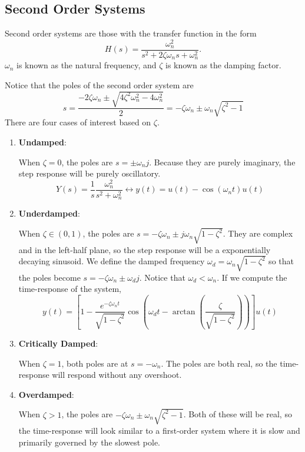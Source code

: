 \subsection{Second Order Systems}
\begin{definition}
  Second order systems are those with the transfer function in the form
  \[
	H(s) = \frac{\omega_n^2}{s^2+2\zeta\omega_ns+\omega_n^2}.
  \]
  $\omega_n$ is known as the natural frequency, and $\zeta$ is known as the damping factor.
  \label{defn:second-order}
\end{definition}
Notice that the poles of the second order system are
\[
  s = \frac{-2\zeta\omega_n \pm \sqrt{4\zeta^2\omega^2_n-4\omega^2_n}}{2} = -\zeta\omega_n \pm \omega_n\sqrt{\zeta^2 - 1}
\]
There are four cases of interest based on $\zeta$.
\begin{enumerate}
  \item \textbf{Undamped}:

	When $\zeta=0$, the poles are $s = \pm \omega_n j$. Because they are purely imaginary, the step response will be purely oscillatory.
	\[
	  Y(s) = \frac{1}{s}\frac{\omega_n^2}{s^2+\omega_n^2} \leftrightarrow y(t) = u(t) - \cos(\omega_n t)u(t)
	\]
  \item \textbf{Underdamped}:

	When $\zeta\in(0, 1)$, the poles are $s = -\zeta\omega_n\pm j\omega_n\sqrt{1-\zeta^2}$. They are complex and in the left-half plane, so the step response will be a exponentially decaying sinusoid.
	We define the damped frequency $\omega_d = \omega_n\sqrt{1-\zeta^2}$ so that the poles become $s=-\zeta\omega_n \pm \omega_dj$. Notice that $\omega_d < \omega_n$.
	If we compute the time-response of the system,
	\[
	  y(t) = \left[ 1 - \frac{e^{-\zeta\omega_nt}}{\sqrt{1-\zeta^2}}\cos\left(\omega_d t - \arctan\left( \frac{\zeta}{\sqrt{1-\zeta^2}} \right)\right)\right]u(t)
	\]
  \item \textbf{Critically Damped}:

	When $\zeta=1$, both poles are at $s=-\omega_n$. The poles are both real, so the time-response will respond without any overshoot.
  \item \textbf{Overdamped}:

	When $\zeta>1$, the poles are $-\zeta\omega_n\pm \omega_n\sqrt{\zeta^2-1}$. Both of these will be real, so the time-response will look similar to a first-order system where it is slow and primarily governed by the slowest pole.
\end{enumerate}
